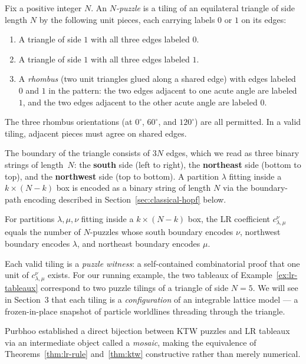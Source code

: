 \begin{definition}
Fix a positive integer $N$.  An \emph{$N$-puzzle} is a tiling of an
equilateral triangle of side length $N$ by the following unit pieces,
each carrying labels $0$ or $1$ on its edges:
\begin{enumerate}
\item A triangle of side $1$ with all three edges labeled $0$.
\item A triangle of side $1$ with all three edges labeled $1$.
\item A \emph{rhombus} (two unit triangles glued along a shared edge)
with edges labeled $0$ and $1$ in the pattern: the two edges adjacent
to one acute angle are labeled $1$, and the two edges adjacent to the
other acute angle are labeled $0$.
\end{enumerate}
The three rhombus orientations (at $0^\circ$, $60^\circ$, and
$120^\circ$) are all permitted.  In a valid tiling, adjacent pieces
must agree on shared edges.

The boundary of the triangle consists of $3N$ edges, which we read as
three binary strings of length~$N$: the \textbf{south} side (left to
right), the \textbf{northeast} side (bottom to top), and the
\textbf{northwest} side (top to bottom).  A partition $\lambda$
fitting inside a $k \times (N-k)$ box is encoded as a binary string
of length $N$ via the boundary-path encoding described in
Section~\ref{sec:classical-hopf} below.
\end{definition}

\begin{theorem}
\label{thm:ktw}
For partitions $\lambda, \mu, \nu$ fitting inside a $k \times (N-k)$
box, the LR coefficient $c^{\nu}_{\lambda,\mu}$ equals the number of
$N$-puzzles whose south boundary encodes $\nu$, northwest boundary
encodes $\lambda$, and northeast boundary encodes $\mu$.
\end{theorem}

Each valid tiling is a \emph{puzzle witness}: a self-contained
combinatorial proof that one unit of $c^{\nu}_{\lambda,\mu}$ exists.
For our running example, the two tableaux of
Example~\ref{ex:lr-tableaux} correspond to two puzzle tilings of a
triangle of side $N=5$.  We will see in Section~3 that each tiling is
a \emph{configuration} of an integrable lattice model --- a
frozen-in-place snapshot of particle worldlines threading through the
triangle.

\begin{remark}
Purbhoo \cite{purbhoo-2007} established a direct bijection between
KTW puzzles and LR tableaux via an intermediate object called a
\emph{mosaic}, making the equivalence of Theorems~\ref{thm:lr-rule}
and~\ref{thm:ktw} constructive rather than merely numerical.
\end{remark}

